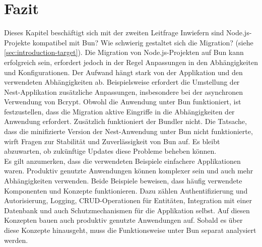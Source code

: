 \section{Fazit} \label{sec:compabitility-conclusion}
Dieses Kapitel beschäftigt sich mit der zweiten Leitfrage \glqq Inwiefern sind Node.js-Projekte kompatibel mit Bun? Wie schwierig gestaltet sich die Migration?\grqq{} (siehe \autoref{sec:introduction-target}). Die Migration von Node.js-Projekten auf Bun kann erfolgreich sein, erfordert jedoch in der Regel Anpassungen in den Abhängigkeiten und Konfigurationen. Der Aufwand hängt stark von der Applikation und den verwendeten Abhängigkeiten ab. Beispielsweise erfordert die Umstellung der Nest-Applikation zusätzliche Anpassungen, insbesondere bei der asynchronen Verwendung von Bcrypt. Obwohl die Anwendung unter Bun funktioniert, ist festzustellen, dass die Migration aktive Eingriffe in die Abhängigkeiten der Anwendung erfordert. Zusätzlich funktioniert der Bundler nicht.  Die Tatsache, dass die minifizierte Version der Nest-Anwendung unter Bun nicht funktionierte, wirft Fragen zur Stabilität und Zuverlässigkeit von Bun auf. Es bleibt abzuwarten, ob zukünftige Updates diese Probleme beheben können.\\

\noindent
Es gilt anzumerken, dass die verwendeten Beispiele einfachere Applikationen waren. Produktiv genutzte Anwendungen können komplexer sein und auch mehr Abhängigkeiten verwenden. Beide Beispiele beweisen, dass häufig verwendete Komponenten und Konzepte funktionieren. Dazu zählen Authentifizierung und Autorisierung, Logging, CRUD-Operationen für Entitäten, Integration mit einer Datenbank und auch Schutzmechanismen für die Applikation selbst. Auf diesen Konzepten bauen auch produktiv genutzte Anwendungen auf. Sobald es über diese Konzepte hinausgeht, muss die Funktionsweise unter Bun separat analysiert werden.